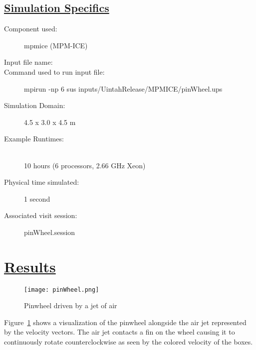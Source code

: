 \subsection*{\underline{Simulation Specifics}}
\begin{description}
\item [Component used:] \hfill mpmice (MPM-ICE)
\item [Input file name:] \hfill {}
\item [Command used to run input file:]\hfill 
mpirun -np 6 sus inputs/UintahRelease/MPMICE/pinWheel.ups

\item [Simulation Domain:]\hfill    4.5 x 3.0 x 4.5 m

\item [Example Runtimes:] \hfill \\
 10 hours   (6 processors, 2.66 GHz Xeon)\\

\item [Physical time simulated:] \hfill 1 second \\ 

\item [Associated visit session:] \hfill pinWheel.session

\end{description}

\newpage

\section*{\underline{Results}}


\begin{figure}
  \centering
  \texttt{[image: pinWheel.png]}
  \caption{Pinwheel driven by a jet of air}
  \label{pinwheel1}
\end{figure}

Figure~\ref{pinwheel1} shows a visualization of the pinwheel alongside the air jet represented by the velocity vectors. The air jet contacts a fin on the wheel causing it to continuously rotate counterclockwise as seen by the colored velocity of the boxes.  
